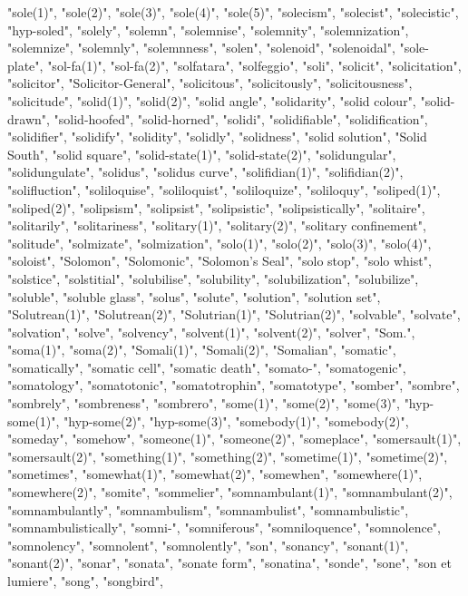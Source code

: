 "sole(1)",
"sole(2)",
"sole(3)",
"sole(4)",
"sole(5)",
"solecism",
"solecist",
"solecistic",
"hyp-soled",
"solely",
"solemn",
"solemnise",
"solemnity",
"solemnization",
"solemnize",
"solemnly",
"solemnness",
"solen",
"solenoid",
"solenoidal",
"sole-plate",
"sol-fa(1)",
"sol-fa(2)",
"solfatara",
"solfeggio",
"soli",
"solicit",
"solicitation",
"solicitor",
"Solicitor-General",
"solicitous",
"solicitously",
"solicitousness",
"solicitude",
"solid(1)",
"solid(2)",
"solid angle",
"solidarity",
"solid colour",
"solid-drawn",
"solid-hoofed",
"solid-horned",
"solidi",
"solidifiable",
"solidification",
"solidifier",
"solidify",
"solidity",
"solidly",
"solidness",
"solid solution",
"Solid South",
"solid square",
"solid-state(1)",
"solid-state(2)",
"solidungular",
"solidungulate",
"solidus",
"solidus curve",
"solifidian(1)",
"solifidian(2)",
"solifluction",
"soliloquise",
"soliloquist",
"soliloquize",
"soliloquy",
"soliped(1)",
"soliped(2)",
"solipsism",
"solipsist",
"solipsistic",
"solipsistically",
"solitaire",
"solitarily",
"solitariness",
"solitary(1)",
"solitary(2)",
"solitary confinement",
"solitude",
"solmizate",
"solmization",
"solo(1)",
"solo(2)",
"solo(3)",
"solo(4)",
"soloist",
"Solomon",
"Solomonic",
"Solomon's Seal",
"solo stop",
"solo whist",
"solstice",
"solstitial",
"solubilise",
"solubility",
"solubilization",
"solubilize",
"soluble",
"soluble glass",
"solus",
"solute",
"solution",
"solution set",
"Solutrean(1)",
"Solutrean(2)",
"Solutrian(1)",
"Solutrian(2)",
"solvable",
"solvate",
"solvation",
"solve",
"solvency",
"solvent(1)",
"solvent(2)",
"solver",
"Som.",
"soma(1)",
"soma(2)",
"Somali(1)",
"Somali(2)",
"Somalian",
"somatic",
"somatically",
"somatic cell",
"somatic death",
"somato-",
"somatogenic",
"somatology",
"somatotonic",
"somatotrophin",
"somatotype",
"somber",
"sombre",
"sombrely",
"sombreness",
"sombrero",
"some(1)",
"some(2)",
"some(3)",
"hyp-some(1)",
"hyp-some(2)",
"hyp-some(3)",
"somebody(1)",
"somebody(2)",
"someday",
"somehow",
"someone(1)",
"someone(2)",
"someplace",
"somersault(1)",
"somersault(2)",
"something(1)",
"something(2)",
"sometime(1)",
"sometime(2)",
"sometimes",
"somewhat(1)",
"somewhat(2)",
"somewhen",
"somewhere(1)",
"somewhere(2)",
"somite",
"sommelier",
"somnambulant(1)",
"somnambulant(2)",
"somnambulantly",
"somnambulism",
"somnambulist",
"somnambulistic",
"somnambulistically",
"somni-",
"somniferous",
"somniloquence",
"somnolence",
"somnolency",
"somnolent",
"somnolently",
"son",
"sonancy",
"sonant(1)",
"sonant(2)",
"sonar",
"sonata",
"sonate form",
"sonatina",
"sonde",
"sone",
"son et lumiere",
"song",
"songbird",
